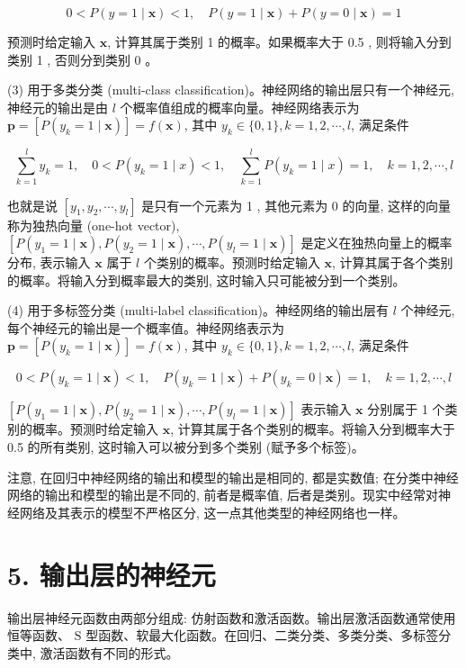 \documentclass[10pt]{article}
\begin{document}
\begin{CJK*}{UTF8}{bsmi}
$$
0<P(y=1 \mid \boldsymbol{x})<1, \quad P(y=1 \mid \boldsymbol{x})+P(y=0 \mid \boldsymbol{x})=1
$$

预测时给定输入 $\boldsymbol{x}$, 计算其属于类别 1 的概率。如果概率大于 0.5 , 则将输入分到类别 1 , 否则分到类别 0 。

(3) 用于多类分类 (multi-class classification)。神经网络的输出层只有一个神经元, 神经元的输出是由 $l$ 个概率值组成的概率向量。神经网络表示为 $\boldsymbol{p}=\left[P\left(y_{k}=1 \mid \boldsymbol{x}\right)\right]=f(\boldsymbol{x})$, 其中 $y_{k} \in\{0,1\}, k=1,2, \cdots, l$, 满足条件

$$
\sum_{k=1}^{l} y_{k}=1, \quad 0<P\left(y_{k}=1 \mid x\right)<1, \quad \sum_{k=1}^{l} P\left(y_{k}=1 \mid x\right)=1, \quad k=1,2, \cdots, l
$$

也就是说 $\left[y_{1}, y_{2}, \cdots, y_{l}\right]$ 是只有一个元素为 1 , 其他元素为 0 的向量, 这样的向量称为独热向量 (one-hot vector), $\left[P\left(y_{1}=1 \mid \boldsymbol{x}\right), P\left(y_{2}=1 \mid \boldsymbol{x}\right), \cdots, P\left(y_{l}=1 \mid \boldsymbol{x}\right)\right]$ 是定义在独热向量上的概率分布, 表示输入 $\boldsymbol{x}$ 属于 $l$ 个类别的概率。预测时给定输入 $\boldsymbol{x}$, 计算其属于各个类别的概率。将输入分到概率最大的类别, 这时输入只可能被分到一个类别。

(4) 用于多标签分类 (multi-label classification)。神经网络的输出层有 $l$ 个神经元,每个神经元的输出是一个概率值。神经网络表示为 $\boldsymbol{p}=\left[P\left(y_{k}=1 \mid \boldsymbol{x}\right)\right]=f(\boldsymbol{x})$, 其中 $y_{k} \in\{0,1\}, k=1,2, \cdots, l$, 满足条件

$$
0<P\left(y_{k}=1 \mid \boldsymbol{x}\right)<1, \quad P\left(y_{k}=1 \mid \boldsymbol{x}\right)+P\left(y_{k}=0 \mid \boldsymbol{x}\right)=1, \quad k=1,2, \cdots, l
$$

$\left[P\left(y_{1}=1 \mid \boldsymbol{x}\right), P\left(y_{2}=1 \mid \boldsymbol{x}\right), \cdots, P\left(y_{l}=1 \mid \boldsymbol{x}\right)\right]$ 表示输入 $\boldsymbol{x}$ 分别属于 1 个类别的概率。预测时给定输入 $\boldsymbol{x}$, 计算其属于各个类别的概率。将输入分到概率大于 0.5 的所有类别, 这时输入可以被分到多个类别 (赋予多个标签)。

注意, 在回归中神经网络的输出和模型的输出是相同的, 都是实数值; 在分类中神经网络的输出和模型的输出是不同的, 前者是概率值, 后者是类别。现实中经常对神经网络及其表示的模型不严格区分, 这一点其他类型的神经网络也一样。

\section*{5. 输出层的神经元}
输出层神经元函数由两部分组成: 仿射函数和激活函数。输出层激活函数通常使用恒等函数、 $\mathrm{S}$ 型函数、软最大化函数。在回归、二类分类、多类分类、多标签分类中, 激活函数有不同的形式。


\end{CJK*}
\end{document}
